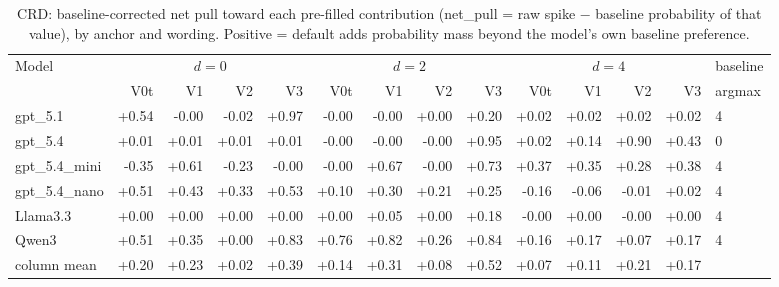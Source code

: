\begin{table}[t]
\centering
\caption{CRD: baseline-corrected net pull toward each pre-filled contribution (net\_pull = raw spike $-$ baseline probability of that value), by anchor and wording. Positive = default adds probability mass beyond the model's own baseline preference.}
\label{tab:crd_spike}
\small
\begin{tabular}{lrrrrrrrrrrrrl}
\toprule
Model & \multicolumn{4}{c}{$d{=}0$} & \multicolumn{4}{c}{$d{=}2$} & \multicolumn{4}{c}{$d{=}4$} & baseline \\
 & V0t & V1 & V2 & V3 & V0t & V1 & V2 & V3 & V0t & V1 & V2 & V3 & argmax \\
\midrule
gpt\_5.1 & +0.54 & -0.00 & -0.02 & +0.97 & -0.00 & -0.00 & +0.00 & +0.20 & +0.02 & +0.02 & +0.02 & +0.02 & 4 \\
gpt\_5.4 & +0.01 & +0.01 & +0.01 & +0.01 & -0.00 & -0.00 & -0.00 & +0.95 & +0.02 & +0.14 & +0.90 & +0.43 & 0 \\
gpt\_5.4\_mini & -0.35 & +0.61 & -0.23 & -0.00 & -0.00 & +0.67 & -0.00 & +0.73 & +0.37 & +0.35 & +0.28 & +0.38 & 4 \\
gpt\_5.4\_nano & +0.51 & +0.43 & +0.33 & +0.53 & +0.10 & +0.30 & +0.21 & +0.25 & -0.16 & -0.06 & -0.01 & +0.02 & 4 \\
Llama3.3 & +0.00 & +0.00 & +0.00 & +0.00 & +0.00 & +0.05 & +0.00 & +0.18 & -0.00 & +0.00 & -0.00 & +0.00 & 4 \\
Qwen3 & +0.51 & +0.35 & +0.00 & +0.83 & +0.76 & +0.82 & +0.26 & +0.84 & +0.16 & +0.17 & +0.07 & +0.17 & 4 \\
\midrule
column mean & +0.20 & +0.23 & +0.02 & +0.39 & +0.14 & +0.31 & +0.08 & +0.52 & +0.07 & +0.11 & +0.21 & +0.17 & \\
\bottomrule
\end{tabular}
\end{table}
